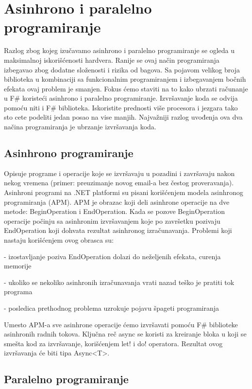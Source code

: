 \documentclass[a4paper]{article}
\begin{document}
\section{Asinhrono i paralelno programiranje}

Razlog zbog kojeg izučavamo asinhrono i paralelno programiranje se ogleda u maksimalnoj iskorišćenosti hardvera. Ranije se ovaj način programiranja izbegavao zbog dodatne složenosti i rizika od bagova. Sa pojavom velikog broja biblioteka u kombinaciji sa funkcionalnim programiranjem i izbegavanjem bočnih efekata ovaj problem je smanjen. Fokus ćemo staviti na to kako ubrzati računanje u F\# koristeći asinhrono i paralelno programiranje. Izvršavanje koda se odvija pomoću niti i F\# biblioteka. 
Iskoristite prednosti više procesora i jezgara tako sto cete podeliti jedan posao na vise manjih. Najvažniji razlog uvođenja ova dva načina programiranja je ubrzanje izvršavanja koda.


\subsection{Asinhrono programiranje} 

Opisuje programe i operacije koje se izvršavaju u pozadini i završavaju nakon nekog vremena (primer: preuzimanje novog email-a bez čestog proveravanja). Asinhroni programi na .NET platformi su pisani korišćenjem modela asinhronog programiranja (APM). APM je obrazac koji deli asinhrone operacije na dve metode: BeginOperation i EndOperation. Kada se pozove BeginOperation operacije počinju sa asinhronim izvršavanjem koje po završetku pozivaju EndOperation koji dohvata rezultat asinhronog izračunavanja. Problemi koji nastaju korišćenjem ovog obrasca su: 

	- izostavljanje poziva EndOperation dolazi do neželjenih efekata, curenja memorije 
 
	- ukoliko se nekoliko asinhronih izračunavanja vrati nazad teško je pratiti tok programa
	
	- posledica prethodnog problema uzrokuje pojavu špageti programiranja

Umesto APM-a sve asinhrone operacije ćemo izvršavati pomoću F\# biblioteke asinhronih radnih tokova\cite{workFlow}. Ključna reč async se koristi za kreiranje bloka u koji se smešta kod za izvršavanje, korišćenjem let! i do! operatora. Rezultat ovog izvršavanja će biti tipa Async<T>\cite{theAL}.

\subsection{Paralelno programiranje}
\end{document}
